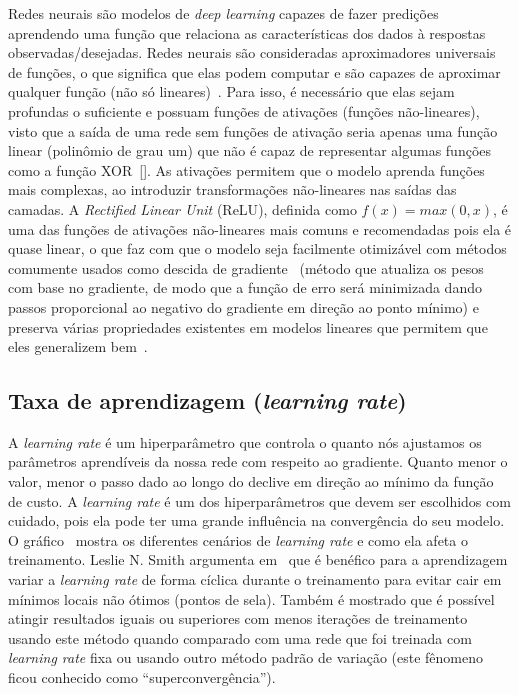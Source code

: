 Redes neurais são modelos de \textit{deep learning} capazes de fazer predições aprendendo uma função que relaciona as características dos dados à respostas observadas/desejadas. Redes neurais são consideradas aproximadores universais de funções, o que significa que elas podem computar e são capazes de aproximar qualquer função (não só lineares)~\cite{dlbook}. Para isso, é necessário que elas sejam profundas o suficiente e possuam funções de ativações (funções não-lineares), visto que a saída de uma rede sem funções de ativação seria apenas uma função linear (polinômio de grau um) que não é capaz de representar algumas funções como a função \acrshort{XOR}~[]. As ativações permitem que o modelo aprenda funções mais complexas, ao introduzir transformações não-lineares nas saídas das camadas. A \textit{Rectified Linear Unit} (\acrshort{ReLU}), definida como $f(x) = max(0, x)$, é uma das funções de ativações não-lineares mais comuns e recomendadas pois ela é quase linear, o que faz com que o modelo seja facilmente otimizável com métodos comumente usados como descida de gradiente~\cite{rumelhart1988learning} (método que atualiza os pesos com base no gradiente, de modo que a função de erro será minimizada dando passos proporcional ao negativo do gradiente em direção ao ponto mínimo) e preserva várias propriedades existentes em modelos lineares que permitem que eles generalizem bem~\cite{deeplearning}. 


\subsection{Taxa de aprendizagem (\textit{learning rate})}
A \textit{learning rate} é um hiperparâmetro que controla o quanto nós ajustamos os parâmetros aprendíveis da nossa rede com respeito ao gradiente. Quanto menor o valor, menor o passo dado ao longo do declive em direção ao mínimo da função de custo. A \textit{learning rate} é um dos hiperparâmetros que devem ser escolhidos com cuidado, pois ela pode ter uma grande influência na convergência do seu modelo. O gráfico~ mostra os diferentes cenários de \textit{learning rate} e como ela afeta o treinamento.
Leslie N. Smith argumenta em~\cite{smith2017cyclical} que é benéfico para a aprendizagem variar a \textit{learning rate} de forma cíclica durante o treinamento para evitar cair em mínimos locais não ótimos (pontos de sela). Também é mostrado que é possível atingir resultados iguais ou superiores com menos iterações de treinamento usando este método quando comparado com uma rede que foi treinada com \textit{learning rate} fixa ou usando outro método padrão de variação (este fênomeno ficou conhecido como ``superconvergência'').

